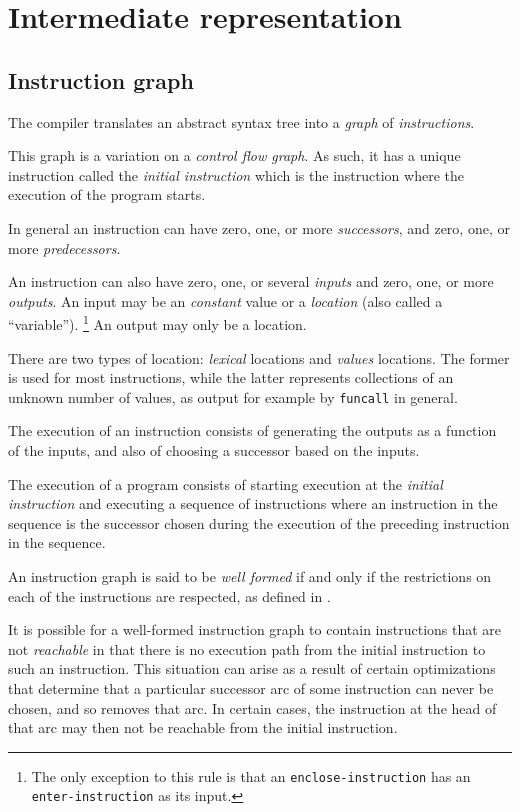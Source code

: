 \chapter{Intermediate representation}
\label{chap-ir}

\section{Instruction graph}

The compiler translates an abstract syntax tree into a \emph{graph} of
\emph{instructions}.

This graph is a variation on a \emph{control flow graph}.  As such, it
has a unique instruction called the \emph{initial instruction} which
is the instruction where the execution of the program starts.

In general an instruction can have zero, one, or more
\emph{successors}, and zero, one, or more \emph{predecessors}.

An instruction can also have zero, one, or several \emph{inputs} and
zero, one, or more \emph{outputs}.  An input may be an \emph{constant}
value or a \emph{location} (also called a ``variable'').%
\footnote{The only exception to this rule is that an
  \texttt{enclose-instruction} has an \texttt{enter-instruction} as
  its input.}  An output may only be a location.

There are two types of location: \emph{lexical} locations and \emph{values} locations. The former is used for most instructions, while the latter represents collections of an unknown number of \commonlisp{} values, as output for example by \texttt{funcall} in general.

The execution of an instruction consists of generating the outputs as
a function of the inputs, and also of choosing a successor based on
the inputs.

The execution of a program consists of starting execution at the
\emph{initial instruction} and executing a sequence of instructions
where an instruction in the sequence is the successor chosen during
the execution of the preceding instruction in the sequence.

An instruction graph is said to be \emph{well formed} if and only if
the restrictions on each of the instructions are respected, as defined
in .

It is possible for a well-formed instruction graph to contain
instructions that are not \emph{reachable} in that there is no
execution path from the initial instruction to such an instruction.
This situation can arise as a result of certain optimizations that
determine that a particular successor arc of some instruction can
never be chosen, and so removes that arc.  In certain cases, the
instruction at the head of that arc may then not be reachable from the
initial instruction.

